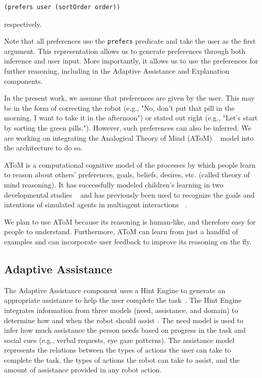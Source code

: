 \documentclass[letterpaper]{article} %
\begin{document}
 \small{
 \begin{verbatim}(prefers user (sortOrder order))
  \end{verbatim}}
 \noindent
 respectively.

 Note that all preferences use the \texttt{prefers} predicate and take the user as the first argument. This representation allows us to generate preferences through both inference and user input. More importantly, it allows us to use the preferences for further reasoning, including in the Adaptive Assistance and Explanation components.

 In the present work, we assume that preferences are given by the user. This may be in the form of correcting the robot (e.g., "No, don't put that pill in the morning. I want to take it in the afternoon") or stated out right (e.g., "Let's start by sorting the green pills."). However, such preferences can also be inferred. We are working on integrating the Analogical Theory of Mind (AToM) ~\cite{rabkina2017towards} model into the architecture to do so.

 AToM is a computational cognitive model of the processes by which people learn to reason about others' preferences, goals, beliefs, desires, etc. (called theory of mind reasoning). It has successfully modeled children's learning in two developmental studies ~\cite{rabkina2017towards,rabkina2018bootstrapping} and has previously been used to recognize the goals and intentions of simulated agents in multiagent interactions ~\cite{rabkina2019analogical,rabkina2020acs}.

 We plan to use AToM because its reasoning is human-like, and therefore easy for people to understand. Furthermore, AToM can learn from just a handful of examples and can incorporate user feedback to improve its reasoning on the fly.

\subsection{Adaptive Assistance}

The Adaptive Assistance component uses a Hint Engine to generate an appropriate assistance to help the user complete the task~\cite{wilson2018general}.  The Hint Engine integrates information from three models (need, assistance, and domain) to determine how and when the robot should assist \cite{wilson2019developing}.  The need model is used to infer how much assistance the person needs based on progress in the task and social cues (e.g., verbal requests, eye gaze patterns).  The assistance model represents the relations between the types of actions the user can take to complete the task, the types of actions the robot can take to assist, and the amount of assistance provided in any robot action.
\end{document}
